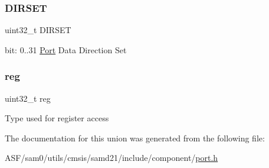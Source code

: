 \subsubsection{\texorpdfstring{DIRSET}{DIRSET}}
{\footnotesize\ttfamily uint32\+\_\+t D\+I\+R\+S\+ET}

bit\+: 0..31 \mbox{\hyperlink{struct_port}{Port}} Data Direction Set \mbox{\label{union_p_o_r_t___d_i_r_s_e_t___type_a6b91636401516a477989a336376d7b40}} 
\subsubsection{\texorpdfstring{reg}{reg}}
{\footnotesize\ttfamily uint32\+\_\+t reg}

Type used for register access 

The documentation for this union was generated from the following file\+:\begin{DoxyCompactItemize}
\item 
A\+S\+F/sam0/utils/cmsis/samd21/include/component/\mbox{\hyperlink{utils_2cmsis_2samd21_2include_2component_2port_8h}{port.\+h}}\end{DoxyCompactItemize}
